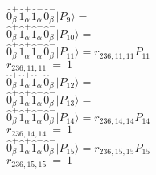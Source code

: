 \documentclass[14pt]{article}
\begin{document}
    $ \hat{0}_{\beta}^{+}\hat{1}_{\alpha}^{+}\hat{1}_{\alpha}^{-}\hat{0}_{\beta}^{-} \vert{P_{9}}\rangle =  $ \\ 
    $ \hat{0}_{\beta}^{+}\hat{1}_{\alpha}^{+}\hat{1}_{\alpha}^{-}\hat{0}_{\beta}^{-} \vert{P_{10}}\rangle =  $ \\ 
    $ \hat{0}_{\beta}^{+}\hat{1}_{\alpha}^{+}\hat{1}_{\alpha}^{-}\hat{0}_{\beta}^{-} \vert{P_{11}}\rangle = {r}_{236,11,11}P_{11} $ \\ 
    ${r}_{236,11,11}\ =\ 1 $ \\ 
    $ \hat{0}_{\beta}^{+}\hat{1}_{\alpha}^{+}\hat{1}_{\alpha}^{-}\hat{0}_{\beta}^{-} \vert{P_{12}}\rangle =  $ \\ 
    $ \hat{0}_{\beta}^{+}\hat{1}_{\alpha}^{+}\hat{1}_{\alpha}^{-}\hat{0}_{\beta}^{-} \vert{P_{13}}\rangle =  $ \\ 
    $ \hat{0}_{\beta}^{+}\hat{1}_{\alpha}^{+}\hat{1}_{\alpha}^{-}\hat{0}_{\beta}^{-} \vert{P_{14}}\rangle = {r}_{236,14,14}P_{14} $ \\ 
    ${r}_{236,14,14}\ =\ 1 $ \\ 
    $ \hat{0}_{\beta}^{+}\hat{1}_{\alpha}^{+}\hat{1}_{\alpha}^{-}\hat{0}_{\beta}^{-} \vert{P_{15}}\rangle = {r}_{236,15,15}P_{15} $ \\ 
    ${r}_{236,15,15}\ =\ 1 $ \\ 
    
\end{document}
